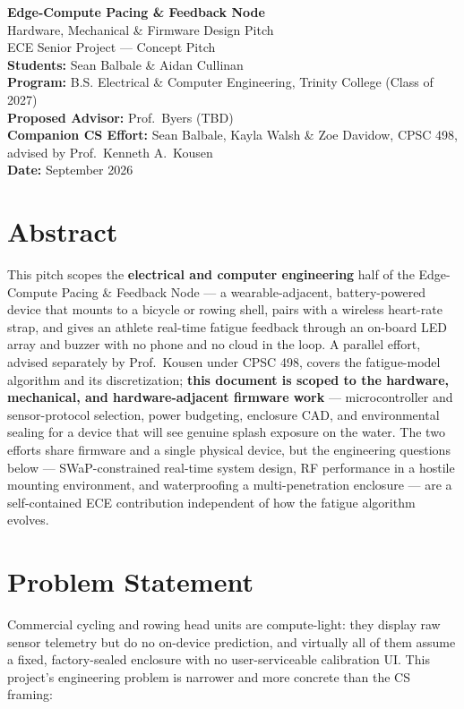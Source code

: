 \documentclass[11pt]{article}
\begin{document}
\begin{center}
{\LARGE \bfseries Edge-Compute Pacing \& Feedback Node}\\[4pt]
{\large Hardware, Mechanical \& Firmware Design Pitch}\\[10pt]
{\normalsize ECE Senior Project --- Concept Pitch}\\[4pt]
\vspace{4pt}
\textbf{Students:} Sean Balbale \& Aidan Cullinan\\
\textbf{Program:} B.S. Electrical \& Computer Engineering, Trinity College (Class of 2027)\\
\textbf{Proposed Advisor:} Prof.\ Byers (TBD)\\
\textbf{Companion CS Effort:} Sean Balbale, Kayla Walsh \& Zoe Davidow, CPSC 498, advised by Prof.\ Kenneth A.\ Kousen\\
\textbf{Date:} September 2026
\end{center}

\section*{Abstract}
This pitch scopes the \textbf{electrical and computer engineering} half of the Edge-Compute Pacing \& Feedback Node --- a wearable-adjacent, battery-powered device that mounts to a bicycle or rowing shell, pairs with a wireless heart-rate strap, and gives an athlete real-time fatigue feedback through an on-board LED array and buzzer with no phone and no cloud in the loop. A parallel effort, advised separately by Prof.\ Kousen under CPSC 498, covers the fatigue-model algorithm and its discretization; \textbf{this document is scoped to the hardware, mechanical, and hardware-adjacent firmware work} --- microcontroller and sensor-protocol selection, power budgeting, enclosure CAD, and environmental sealing for a device that will see genuine splash exposure on the water. The two efforts share firmware and a single physical device, but the engineering questions below --- SWaP-constrained real-time system design, RF performance in a hostile mounting environment, and waterproofing a multi-penetration enclosure --- are a self-contained ECE contribution independent of how the fatigue algorithm evolves.

\section{Problem Statement}
Commercial cycling and rowing head units are compute-light: they display raw sensor telemetry but do no on-device prediction, and virtually all of them assume a fixed, factory-sealed enclosure with no user-serviceable calibration UI. This project's engineering problem is narrower and more concrete than the CS framing:
\end{document}
